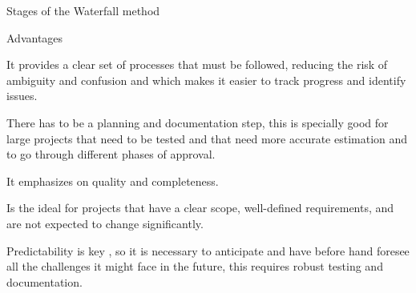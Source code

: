 \begin{frame}{Stages of the Waterfall method}    
    \begin{block}{Advantages}
        \item It provides a clear set of processes that must be followed, reducing the risk of ambiguity and confusion and which makes it easier to track progress and identify issues. 
        
        \item  There has to be a planning and documentation step, this is specially good for large projects that need to be tested and that need more accurate estimation and to go through different phases of approval.
        
        \item It emphasizes on quality and completeness.
        
        \item  Is the ideal for projects that have a clear scope, well-defined requirements, and are not expected to change significantly.
        
        \item Predictability  is key , so it is necessary to anticipate and have before hand foresee all the challenges it might face in the future, this requires robust testing and documentation.
     
    \end{block}

    \end{frame}
